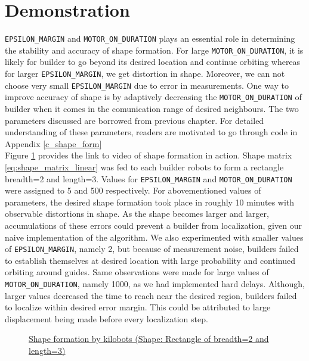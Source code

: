 \documentclass{report}[12pt]
\begin{document}
\section{Demonstration}
\texttt{EPSILON\_MARGIN} and \texttt{MOTOR\_ON\_DURATION} plays an essential role in determining the stability and accuracy of shape formation. For large \texttt{MOTOR\_ON\_DURATION}, it is likely for builder to go beyond its desired location and continue orbiting whereas for larger \texttt{EPSILON\_MARGIN}, we get distortion in shape. Moreover, we can not choose very small \texttt{EPSILON\_MARGIN} due to error in measurements. One way to improve accuracy of shape is by adaptively decreasing the \texttt{MOTOR\_ON\_DURATION} of builder when it comes in the comunication range of desired neighbours. The two parameters discussed are borrowed from previous chapter. For detailed understanding of these parameters, readers are motivated to go through code in Appendix \ref{c_shape_form}\\
Figure \ref{fig:shape_formation_demo} provides the link to video of shape formation in action. Shape matrix \eqref{eq:shape_matrix_linear} was fed to each builder robots to form a rectangle  breadth=2 and length=3. Values for \texttt{EPSILON\_MARGIN} and \texttt{MOTOR\_ON\_DURATION} were assigned to 5 and 500 respectively. For abovementioned values of parameters, the desired shape formation took place in roughly 10 minutes with observable distortions in shape. As the shape becomes larger and larger, accumulations of these errors could prevent a builder from localization, given our naive implementation of the algorithm. We also experimented with smaller values of \texttt{EPSILON\_MARGIN}, namely 2, but because of measurement noise, builders failed to establish themselves at desired location with large probability and continued orbiting around guides. Same observations were made for large values of \texttt{MOTOR\_ON\_DURATION}, namely 1000, as we had implemented hard delays. Although, larger values decreased the time to reach near the desired region, builders failed to localize within desired error margin. This could be attributed to large displacement being made before every localization step.
\begin{figure}[H]
	\centering
	\caption{\href{https://youtu.be/SoDq9GQvNAE}{Shape formation by kilobots (Shape: Rectangle of breadth=2 and length=3)}}
	\label{fig:shape_formation_demo}
\end{figure}
\end{document}
